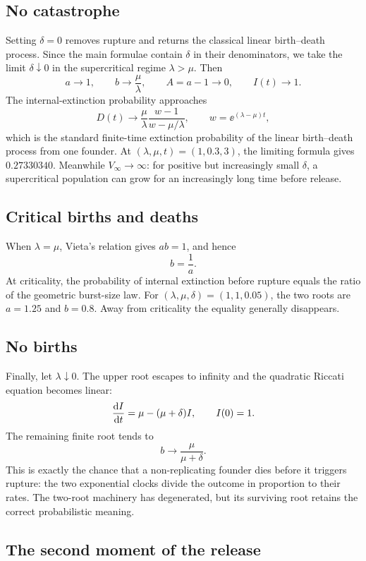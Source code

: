 \subsection{No catastrophe}
\label{bdc:app:nocatastrophe}

Setting $\delta=0$ removes rupture and returns the classical linear
birth--death process. Since the main formulae contain $\delta$ in their
denominators, we take the limit $\delta\downarrow0$ in the supercritical regime
$\lambda>\mu$. Then
\[
a\to1,\qquad b\to\frac{\mu}{\lambda},\qquad
A=a-1\to0,\qquad I(t)\to1.
\]
The internal-extinction probability approaches
\[
D(t)\longrightarrow
\frac{\mu}{\lambda}
\frac{w-1}{w-\mu/\lambda},
\qquad
w=\ee^{(\lambda-\mu)t},
\]
which is the standard finite-time extinction probability of the linear
birth--death process from one founder. At
$(\lambda,\mu,t)=(1,0.3,3)$, the limiting formula gives $0.27330340$.
Meanwhile $V_\infty\to\infty$: for positive but increasingly small
$\delta$, a supercritical population can grow for an increasingly long time
before release.

\subsection{Critical births and deaths}
\label{bdc:app:critical}

When $\lambda=\mu$, Vieta's relation gives $ab=1$, and hence
\[
b=\frac{1}{a}.
\]
At criticality, the probability of internal extinction before rupture equals
the ratio of the geometric burst-size law. For
$(\lambda,\mu,\delta)=(1,1,0.05)$, the two roots are $a=1.25$ and $b=0.8$.
Away from criticality the equality generally disappears.

\subsection{No births}
\label{bdc:app:nobirths}

Finally, let $\lambda\downarrow0$. The upper root escapes to infinity and the
quadratic Riccati equation becomes linear:
\[
\frac{\mathrm{d} I}{\mathrm{d} t}=\mu-(\mu+\delta)I,
\qquad I(0)=1.
\]
The remaining finite root tends to
\[
b\longrightarrow\frac{\mu}{\mu+\delta}.
\]
This is exactly the chance that a non-replicating founder dies before it
triggers rupture: the two exponential clocks divide the outcome in proportion
to their rates. The two-root machinery has degenerated, but its surviving root
retains the correct probabilistic meaning.

\subsection{The second moment of the release}
\label{bdc:app:Wsq}

